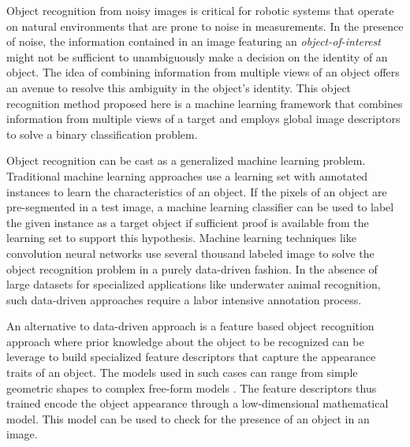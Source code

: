\documentclass {udthesis}
\begin{document}
Object recognition from noisy images is critical for robotic systems that operate on natural environments that are prone to noise in measurements. In the presence of noise, the information contained in an image featuring an \emph{object-of-interest} might not be sufficient to unambiguously make a decision on the identity of an object. The idea of combining information from multiple views of an object offers an avenue to resolve this ambiguity in the object's identity. This object recognition method proposed here is a machine learning framework that combines information from multiple views of a target and employs global image descriptors to solve a binary classification problem.

Object recognition can be cast as a generalized machine learning problem. Traditional machine learning approaches \cite{alpaydin} use a learning set with annotated instances to learn the characteristics of an object. If the pixels of an object are pre-segmented in a test image, a machine learning classifier can be used to label the given instance as a target object if sufficient proof is available from the learning set to support this hypothesis. Machine learning techniques like convolution neural networks \cite{cnn} use several thousand labeled image to solve the object recognition problem in a purely data-driven fashion. In the absence of large datasets for specialized applications like underwater animal recognition, such data-driven approaches require a labor intensive annotation process.

An alternative to data-driven approach is a feature based object recognition approach \cite{roth} where prior knowledge about the object to be recognized can be leverage to build specialized feature descriptors that capture the appearance traits of an object. The models used in such cases can range from simple geometric shapes to complex free-form models \cite{campbell, belongie}. The feature descriptors thus trained encode the object appearance through a low-dimensional mathematical model. This model can be used to check for the presence of an object in an image.
\end{document}
